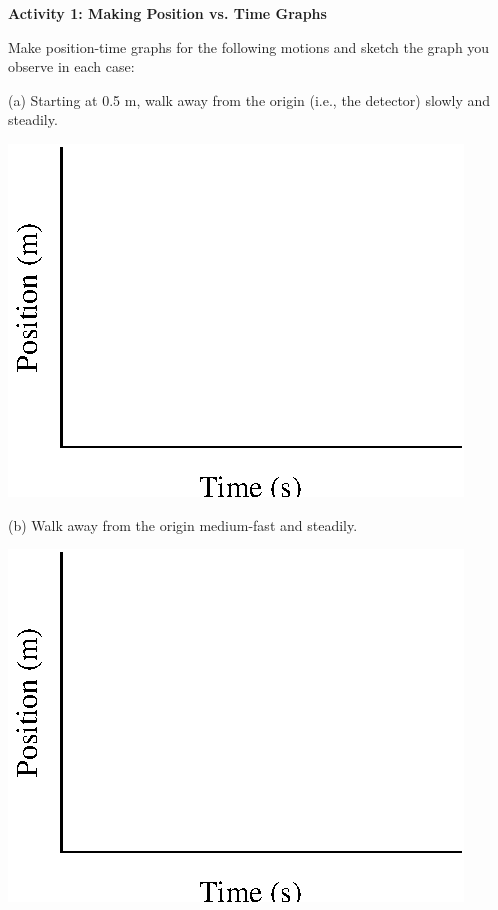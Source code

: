 \textbf{Activity 1: Making Position vs. Time Graphs }

Make position-time graphs for the following motions and sketch the graph you
observe in each case:

(a) Starting at 0.5 m, walk away from the origin (i.e., the detector) slowly
and steadily.

\vspace{0.3cm}
{\par\centering \includegraphics{position/position_fig1.eps} \par}
\vspace{0.3cm}

(b) Walk away from the origin medium-fast and steadily.

\vspace{0.3cm}
{\par\centering \includegraphics{position/position_fig1.eps} \par}
\vspace{0.3cm}

